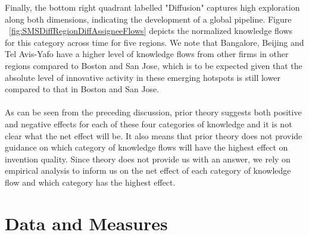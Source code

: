 \documentclass[10pt,letterpaper]{article}
\begin{document}
Finally, the bottom right quadrant labelled "Diffusion" captures high exploration along both dimensions, indicating the development of a global pipeline. Figure ~\ref{fig:SMSDiffRegionDiffAssigneeFlows} depicts the normalized knowledge flows for this category across time for five regions. We note that Bangalore, Beijing and Tel Avis-Yafo have a higher level of knowledge flows from other firms in other regions compared to Boston and San Jose, which is to be expected given that the absolute level of innovative activity in these emerging hotspots is still lower compared to that in Boston and San Jose.
\\\\
As can be seen from the preceding discussion, prior theory suggests both positive and negative effects for each of these four categories of knowledge and it is not clear what the net effect will be. It also means that prior theory does not provide guidance on which category of knowledge flows will have the highest effect on invention quality.  Since theory does not provide us with an answer, we rely on empirical analysis to inform us on the net effect of each category of knowledge flow and which category has the highest effect.

\section*{Data and Measures}
\end{document}
